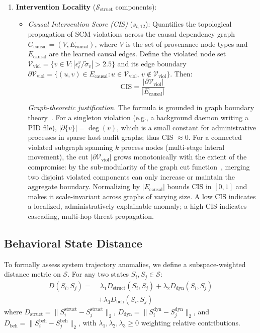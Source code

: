 \begin{enumerate}
\begin{itemize}
\end{itemize}
\item \textbf{Intervention Locality} ($\mathcal{S}_{\text{struct}}$ components):
\begin{itemize}
\item \textit{Causal Intervention Score (CIS)} ($s_{t,12}$): Quantifies the topological propagation of SCM violations across the causal dependency graph $G_{\text{causal}} = (V, E_{\text{causal}})$, where $V$ is the set of provenance node types and $E_{\text{causal}}$ are the learned causal edges. Define the violated node set $\mathcal{V}_{\text{viol}} = \{v \in V : |\epsilon^v_t / \tilde{\sigma}_v| > 2.5\}$ and its edge boundary $\partial \mathcal{V}_{\text{viol}} = \{(u,v) \in E_{\text{causal}} : u \in \mathcal{V}_{\text{viol}},\, v \notin \mathcal{V}_{\text{viol}}\}$. Then:
\begin{equation}
\text{CIS} = \frac{|\partial \mathcal{V}_{\text{viol}}|}{|E_{\text{causal}}|}
\end{equation}

\textit{Graph-theoretic justification.} The formula is grounded in graph boundary theory~\cite{chung1997spectral}. For a singleton violation (e.g., a background daemon writing a PID file), $|\partial\{v\}| = \deg(v)$, which is a small constant for administrative processes in sparse host audit graphs; thus CIS $\approx 0$. For a connected violated subgraph spanning $k$ process nodes (multi-stage lateral movement), the cut $|\partial \mathcal{V}_{\text{viol}}|$ grows monotonically with the extent of the compromise: by the sub-modularity of the graph cut function~\cite{chung1997spectral}, merging two disjoint violated components can only increase or maintain the aggregate boundary. Normalizing by $|E_{\text{causal}}|$ bounds CIS in $[0, 1]$ and makes it scale-invariant across graphs of varying size. A low CIS indicates a localized, administratively explainable anomaly; a high CIS indicates cascading, multi-hop threat propagation.
\end{itemize}
\end{enumerate}

\subsection{Behavioral State Distance}
\label{sec:state_distance}
To formally assess system trajectory anomalies, we define a subspace-weighted distance metric on $\mathcal{S}$. For any two states $S_i, S_j \in \mathcal{S}$:
\begin{equation}
\begin{split}
D(S_i, S_j) = & \;\lambda_1 D_{\text{struct}}(S_i, S_j) + \lambda_2 D_{\text{dyn}}(S_i, S_j) \\
               & + \lambda_3 D_{\text{beh}}(S_i, S_j)
\end{split}
\end{equation}
where $D_{\text{struct}} = \|S_i^{\text{struct}} - S_j^{\text{struct}}\|_2$, $D_{\text{dyn}} = \|S_i^{\text{dyn}} - S_j^{\text{dyn}}\|_2$, and $D_{\text{beh}} = \|S_i^{\text{beh}} - S_j^{\text{beh}}\|_2$, with $\lambda_1, \lambda_2, \lambda_3 \geq 0$ weighting relative contributions.

